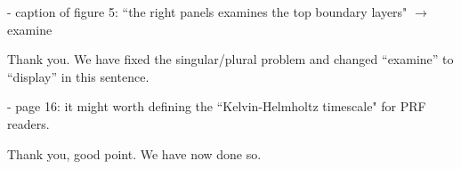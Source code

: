 \documentclass[aps, 11pt, singlecolumn]{revtex4-1} %
\begin{document}
\begin{singlespace}
\begin{myquotation}
- caption of figure 5: ``the right panels examines the top boundary layers" $\rightarrow$ examine
\end{myquotation}
Thank you.
We have fixed the singular/plural problem and changed ``examine'' to ``display'' in this sentence.

\begin{myquotation}
- page 16: it might worth defining the ``Kelvin-Helmholtz timescale" for PRF readers.
\end{myquotation}
Thank you, good point.
We have now done so.



\end{singlespace}

\end{document}
